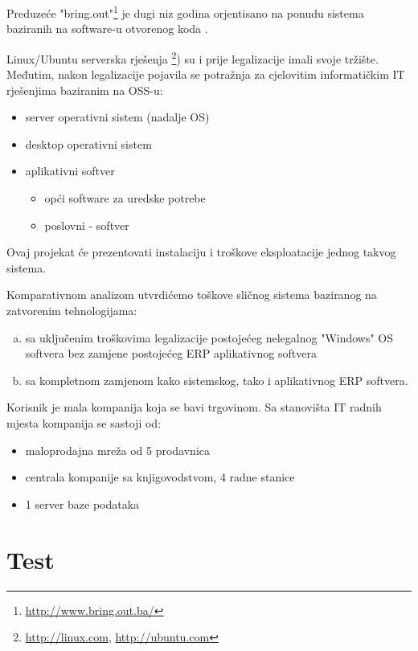 \documentclass[times, utf8, seminar]{fit}
\begin{document}
Preduzeće "bring.out"\footnote{\url{http://www.bring.out.ba/}} je dugi niz godina orjentisano na ponudu sistema baziranih na software-u otvorenog koda .

Linux/Ubuntu serverska rješenja \footnote{\url{http://linux.com}, \url{http://ubuntu.com}}) su i prije legalizacije imali svoje tržište. Međutim, nakon legalizacije pojavila se potražnja za cjelovitim informatičkim IT rješenjima baziranim na OSS-u:
\begin{itemize}
  \item server operativni sistem (nadalje OS)
  \item desktop operativni sistem
  \item aplikativni softver
  \begin{itemize}
    \item opći software za uredske potrebe
    \item poslovni - softver 
  \end{itemize}
\end{itemize}

Ovaj projekat će prezentovati instalaciju i troškove eksploatacije jednog takvog sistema.

Komparativnom analizom utvrdićemo toškove sličnog sistema baziranog na zatvorenim tehnologijama:
\begin{enumerate}[(a)]
  \item sa uključenim troškovima legalizacije postojećeg nelegalnog "Windows" OS softvera bez zamjene postojećeg ERP aplikativnog softvera
  \item sa kompletnom zamjenom kako sistemskog, tako i aplikativnog ERP softvera.  
\end{enumerate}

Korisnik je mala kompanija koja se bavi trgovinom. Sa stanovišta IT radnih mjesta kompanija se sastoji od:
\begin{itemize}
  \item maloprodajna mreža od 5 prodavnica
  \item centrala kompanije sa knjigovodstvom, 4 radne stanice
  \item 1 server baze podataka 
\end{itemize}


\section{Test}
\end{document}
